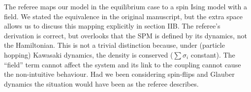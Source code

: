 \documentclass[a4paper,10pt]{article}
\begin{document}
The referee maps our model in the equilibrium case to a spin Ising
model with a field.  We stated the equivalence in the original
manuscript, but the extra space allows us to discuss this mapping
explicitly in section IIB.  The referee's derivation is correct, but
overlooks that the SPM is defined by its dynamics, not the
Hamiltonian.  This is not a trivial distinction because, under
(particle hopping) Kawasaki dynamics, the density is conserved
($\sum\sigma_i$ constant). The ``field'' term cannot affect the system
and its link to the coupling cannot cause the non-intuitive behaviour.
Had we been considering spin-flips and Glauber dynamics the situation
would have been as the referee describes.
\end{document}
